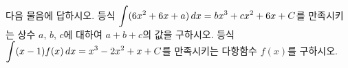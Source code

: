 다음 물음에 답하시오.
 등식 $\displaystyle\int (6x^2+6x+a)\mkern3mu dx=bx^3+cx^2+6x+C$를 만족시키는 상수 $a$, $b$, $c$에 대하여 $a+b+c$의 값을 구하시오. 
 등식 $\displaystyle\int (x-1)f(x)\mkern3mu dx=x^3-2x^2+x+C$를 만족시키는 다항함수 $f(x)$를 구하시오. 
